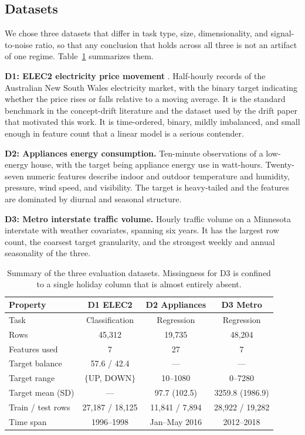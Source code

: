 \documentclass{ieeeaccess}
\begin{document}
\subsection{Datasets}
We chose three datasets that differ in task type, size, dimensionality, and signal-to-noise ratio, so that any conclusion that holds across all three is not an artifact of one regime. Table~\ref{tab:datasets} summarizes them.

\textbf{D1: ELEC2 electricity price movement} \cite{drift2024}. Half-hourly records of the Australian New South Wales electricity market, with the binary target indicating whether the price rises or falls relative to a moving average. It is the standard benchmark in the concept-drift literature and the dataset used by the drift paper that motivated this work. It is time-ordered, binary, mildly imbalanced, and small enough in feature count that a linear model is a serious contender.

\textbf{D2: Appliances energy consumption.} Ten-minute observations of a low-energy house, with the target being appliance energy use in watt-hours. Twenty-seven numeric features describe indoor and outdoor temperature and humidity, pressure, wind speed, and visibility. The target is heavy-tailed and the features are dominated by diurnal and seasonal structure.

\textbf{D3: Metro interstate traffic volume.} Hourly traffic volume on a Minnesota interstate with weather covariates, spanning six years. It has the largest row count, the coarsest target granularity, and the strongest weekly and annual seasonality of the three.

\begin{table}[t]
\caption{Summary of the three evaluation datasets. Missingness for D3 is confined to a single holiday column that is almost entirely absent.}
\label{tab:datasets}
\centering
\footnotesize
\setlength{\tabcolsep}{3pt}
\begin{tabular}{lccc}
\toprule
Property & D1 ELEC2 & D2 Appliances & D3 Metro \\
\midrule
Task & Classification & Regression & Regression \\
Rows & 45{,}312 & 19{,}735 & 48{,}204 \\
Features used & 7 & 27 & 7 \\
Target balance & 57.6 / 42.4 & --- & --- \\
Target range & $\{$UP, DOWN$\}$ & 10--1080 & 0--7280 \\
Target mean (SD) & --- & 97.7 (102.5) & 3259.8 (1986.9) \\
Train / test rows & 27{,}187 / 18{,}125 & 11{,}841 / 7{,}894 & 28{,}922 / 19{,}282 \\
Time span & 1996--1998 & Jan--May 2016 & 2012--2018 \\
\bottomrule
\end{tabular}
\end{table}
\end{document}
